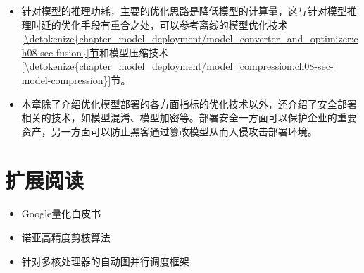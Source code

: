 \documentclass[letterpaper,10pt,english]{sphinxmanual}
\begin{document}
\begin{itemize}
\item {} 
\sphinxAtStartPar
针对模型的推理功耗，主要的优化思路是降低模型的计算量，这与针对模型推理时延的优化手段有重合之处，可以参考离线的模型优化技术
\hyperref[\detokenize{chapter_model_deployment/model_converter_and_optimizer:ch08-sec-fusion}]{\ref{\detokenize{chapter_model_deployment/model_converter_and_optimizer:ch08-sec-fusion}}节}和模型压缩技术
\hyperref[\detokenize{chapter_model_deployment/model_compression:ch08-sec-model-compression}]{\ref{\detokenize{chapter_model_deployment/model_compression:ch08-sec-model-compression}}节}。

\item {} 
\sphinxAtStartPar
本章除了介绍优化模型部署的各方面指标的优化技术以外，还介绍了安全部署相关的技术，如模型混淆、模型加密等。部署安全一方面可以保护企业的重要资产，另一方面可以防止黑客通过篡改模型从而入侵攻击部署环境。

\end{itemize}


\section{扩展阅读}
\label{\detokenize{chapter_model_deployment/summary:id2}}\begin{itemize}
\item {} 
\sphinxAtStartPar
Google量化白皮书 %
\begin{footnote}[41]\sphinxAtStartFootnote
{}
%
\end{footnote}

\item {} 
\sphinxAtStartPar
诺亚高精度剪枝算法 %
\begin{footnote}[42]\sphinxAtStartFootnote
{}
%
\end{footnote}

\item {} 
\sphinxAtStartPar
针对多核处理器的自动图并行调度框架
%
\begin{footnote}[43]\sphinxAtStartFootnote
{}
%
\end{footnote}

\end{itemize}
\end{document}
